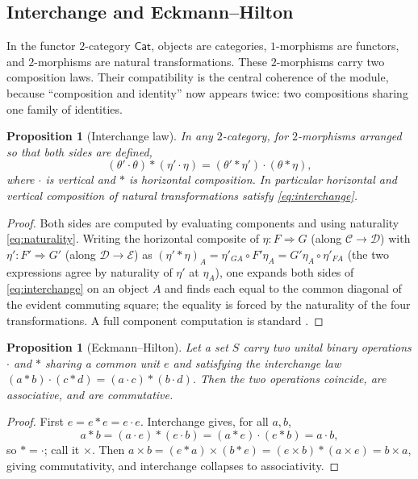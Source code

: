 \documentclass[12pt]{article}
\newtheorem{proposition}[theorem]{Proposition}
\theoremstyle{definition}
\theoremstyle{remark}
\newcommand{\Cat}{\mathsf{Cat}}
\begin{document}
\subsection{Interchange and Eckmann--Hilton}

In the functor $2$-category $\Cat$, objects are categories, $1$-morphisms are
functors, and $2$-morphisms are natural transformations. These $2$-morphisms
carry two composition laws. Their compatibility is the central
coherence of the module, because ``composition and identity'' now appears
twice: two compositions sharing one family of identities.

\begin{proposition}[Interchange law]
\label{prop:interchange}
In any $2$-category, for $2$-morphisms arranged so that both sides are defined,
\begin{equation}
\label{eq:interchange}
(\theta'\cdot\theta)\ast(\eta'\cdot\eta)=(\theta'\ast\eta')\cdot(\theta\ast\eta),
\end{equation}
where $\cdot$ is vertical and $\ast$ is horizontal composition. In particular
horizontal and vertical composition of natural transformations satisfy
\eqref{eq:interchange}.
\end{proposition}

\begin{proof}
Both sides are computed by evaluating components and using naturality
\eqref{eq:naturality}. Writing the horizontal composite of $\eta:F\Rightarrow G$
(along $\mathcal{C}\to\mathcal{D}$) with $\eta':F'\Rightarrow G'$ (along
$\mathcal{D}\to\mathcal{E}$) as $(\eta'\ast\eta)_A=\eta'_{GA}\circ F'\eta_A
=G'\eta_A\circ\eta'_{FA}$ (the two expressions agree by naturality of $\eta'$ at
$\eta_A$), one expands both sides of \eqref{eq:interchange} on an object $A$ and
finds each equal to the common diagonal of the evident commuting square; the
equality is forced by the naturality of the four transformations. A full
component computation is standard \cite[Ch.~II]{MacLane1998}.
\end{proof}

\begin{proposition}[Eckmann--Hilton]
\label{prop:eckmann-hilton}
Let a set $S$ carry two unital binary operations $\cdot$ and $\ast$ sharing a
common unit $e$ and satisfying the interchange law
$(a\ast b)\cdot(c\ast d)=(a\cdot c)\ast(b\cdot d)$. Then the two operations
coincide, are associative, and are commutative.
\end{proposition}

\begin{proof}
First $e=e\ast e=e\cdot e$. Interchange gives, for all $a,b$,
\[
a\ast b=(a\cdot e)\ast(e\cdot b)=(a\ast e)\cdot(e\ast b)=a\cdot b,
\]
so $\ast=\cdot$; call it $\times$. Then
$a\times b=(e\ast a)\times(b\ast e)=(e\times b)\ast(a\times e)=b\times a$, giving
commutativity, and interchange collapses to associativity.
\end{proof}
\end{document}
